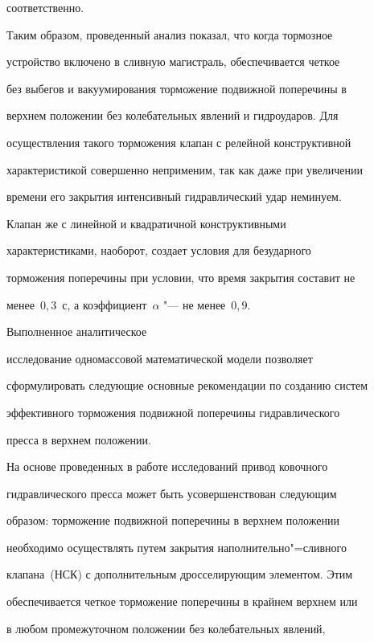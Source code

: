 соответственно.



Таким образом, проведенный анализ показал, что когда тормозное

устройство включено в сливную магистраль, обеспечивается четкое

без выбегов и вакуумирования торможение подвижной поперечины в

верхнем положении без колебательных явлений и гидроударов. Для

осуществления такого торможения клапан с релейной конструктивной

характеристикой совершенно неприменим, так как даже при увеличении

времени его закрытия интенсивный гидравлический удар неминуем.

Клапан же с линейной и квадратичной конструктивными

характеристиками, наоборот, создает условия для безударного

торможения поперечины при условии, что время закрытия составит не

менее~$0,3$~с, а коэффициент~$\alpha$ "--- не менее~$0,9$.



 \smallskip



 Выполненное аналитическое

исследование одномассовой математической модели позволяет

сформулировать следующие основные рекомендации по созданию систем

эффективного торможения подвижной поперечины гидравлического

пресса в верхнем положении.



На основе проведенных в работе исследований привод ковочного

гидравлического пресса может быть усовершенствован следующим

образом: торможение подвижной поперечины в верхнем положении

необходимо осуществлять путем закрытия наполнительно"=сливного

клапана~(НСК) с дополнительным дросселирующим элементом. Этим

обеспечивается четкое  торможение поперечины в крайнем верхнем или

в любом промежуточном положении без колебательных явлений,

